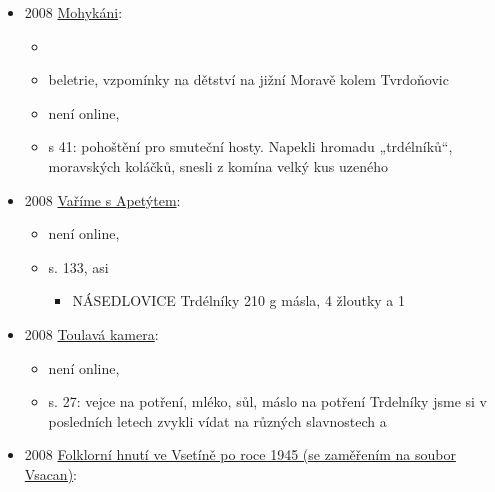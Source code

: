 \begin{itemize}
  \begin{itemize}
  \tightlist
  \item
    článek o Slovácké búdě v Luhačovicích
  \item
    s. 107: ceník, trdelník za 30 halířů
  \item
    s. 111: Emilie Jurkovičová měla na starosti kuchyni, nabízeli
    skalický zázvorníky, trdelníky a pagáčky
  \end{itemize}
\item
  2008
  \href{https://ndk.cz/uuid/uuid:8b8b85b0-b560-11f0-a1a9-5ef3fc9bb22f}{Mohykáni}:

  \begin{itemize}
  \tightlist
  \item
  \item
    beletrie, vzpomínky na dětství na jižní Moravě kolem Tvrdoňovic
  \item
    není online, 
  \item
    s 41: pohoštění pro smuteční hosty. Napekli hromadu „trdélníků``,
    moravských koláčků, snesli z komína velký kus uzeného
  \end{itemize}
\item
  2008
  \href{https://www.digitalniknihovna.cz/mzk/uuid/uuid:3ae7cd10-6f0a-11ee-9a22-5ef3fc9bb22f}{Vaříme
  s Apetýtem}:

  \begin{itemize}
  \tightlist
  \item
    není online, 
  \item
    s. 133, asi 

    \begin{itemize}
    \tightlist
    \item
      NÁSEDLOVICE Trdélníky 210 g másla, 4 žloutky a 1
    \end{itemize}
  \end{itemize}
\item
  2008
  \href{https://www.digitalniknihovna.cz/mzk/uuid/uuid:250e9900-391c-11e6-a5c5-005056827e51}{Toulavá
  kamera}:

  \begin{itemize}
  \tightlist
  \item
    není online, 
  \item
    s. 27: vejce na potření, mléko, sůl, máslo na potření Trdelníky jsme
    si v posledních letech zvykli vídat na různých slavnostech a
  \end{itemize}
\item
  2008 \href{https://is.muni.cz/th/yosmw/Text_prace.pdf}{Folklorní hnutí
  ve Vsetíně po roce 1945 (se zaměřením na soubor Vsacan)}:


\end{itemize}
